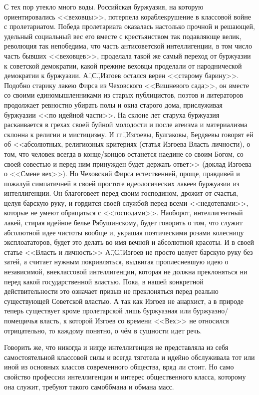 С тех пор утекло много воды. Российская буржуазия, на которую ориентировались <<веховцы>>, потерпела кораблекрушение в классовой войне с пролетариатом. Победа пролетариата оказалась настолько прочной и решающей, удельный социальный вес его вместе с крестьянством так подавляюще велик, революция так непобедима, что часть антисоветской интеллигенции, в том число часть бывших <<веховцев>>, проделала такой же самый переход от буржуазии к советской демократии, какой прежние веховцы проделали от народнической демократии к буржуазии. А.\=,С.\=,Изгоев остался верен <<старому барину>>. Подобно старику лакею Фирса из Чеховского <<Вишневого сада>>, он вместе со своими единомышленниками из старых публицистов, поэтов и литераторов продолжает ревностно убирать полы и окна старого дома, прислуживая буржуазии <<по идейной части>>. На склоне лет старуха буржуазия раскаивается в грехах своей буйной молодости и после атеизма и материализма склонна к религии и мистицизму. И гг.\=,Изгоевы, Булгаковы, Бердяевы говорят ей об <<абсолютных, религиозных критериях (статья Изгоева \glqq Власть личности\grqq), о том, что человек всегда в конце\-/концов останется наедине со своим Богом, со своей совестью и перед ним принужден будет держать ответ>> (доклад Изгоева о <<Смене вех>>). Но Чеховский Фирса естественней, проще, правдивей и пожалуй симпатичней в своей простоте идеологических лакеев буржуазии из интеллигенции. Он благоговеет перед своим господином, дрожит от счастья, целуя барскую руку, и гордится своей службой перед всеми <<недотепами>>, которые не умеют обращаться с <<господами>>. Наоборот, интеллигентный лакей, стирая идейное белье Рябушинскому, будет говорить о том, что служит абсолютной идее чистоты вообще и, украшая поэтическими розами колесницу эксплоататоров, будет это делать во имя вечной и абсолютной красоты. И в своей статье <<Власть и личность>> А.\=,С.\=,Изгоев не просто целует барскую руку без затей, а считает нужным покривляться, выдвигая проплесневшую идею о независимой, внеклассовой интеллигенции, которая не должна преклоняться ни перед какой государственной властью. Пока, в нашей конкретной действительности это означает призыв не преклоняться перед реально существующей Советской властью. А так как Изгоев не анархист, а в природе теперь существует кроме пролетарской лишь буржуазная или буржуазно\-/помещичья власть, к которой Изгоев со времени <<Вех>> не относился отрицательно, то каждому понятно, о чём в сущности идет речь.

Говорить же, что никогда и нигде интеллигенция не представляла из себя самостоятельной классовой силы и всегда тяготела и идейно обслуживала тот или иной из основных классов современного общества, вряд ли стоит. Но само свойство профессии интеллигенции и интерес общественного класса, которому она служит, требуют такого самоббмана и обмана масс.

